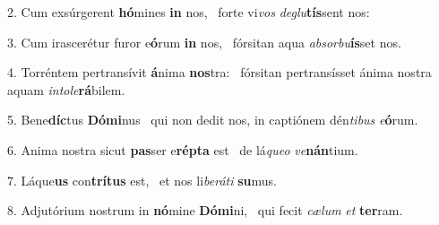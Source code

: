 2. Cum exsúrgerent \textbf{hó}mines \textbf{in} nos, \ast\  forte vi\textit{vos} \textit{de}\textit{glu}\textbf{tís}sent nos:\

3. Cum irascerétur furor e\textbf{ó}rum \textbf{in} nos, \ast\  fórsitan aqua \textit{ab}\textit{sor}\textit{bu}\textbf{ís}set nos.\

4. Torréntem pertransívit \textbf{á}nima \textbf{nos}tra: \ast\  fórsitan pertransísset ánima nostra aquam \textit{in}\textit{to}\textit{le}\textbf{rá}bilem.\

5. Bene\textbf{díc}tus \textbf{Dó}\textbf{mi}nus \ast\  qui non dedit nos, in captiónem dén\textit{ti}\textit{bus} \textit{e}\textbf{ó}rum.\

6. Anima nostra sicut \textbf{pas}ser e\textbf{rép}\textbf{ta} est \ast\  de lá\textit{que}\textit{o} \textit{ve}\textbf{nán}tium.\

7. Láque\textbf{us} con\textbf{trí}\textbf{tus} est, \ast\  et nos li\textit{be}\textit{rá}\textit{ti} \textbf{su}mus.\

8. Adjutórium nostrum in \textbf{nó}mine \textbf{Dó}\textbf{mi}ni, \ast\  qui fecit \textit{cæ}\textit{lum} \textit{et} \textbf{ter}ram.\

